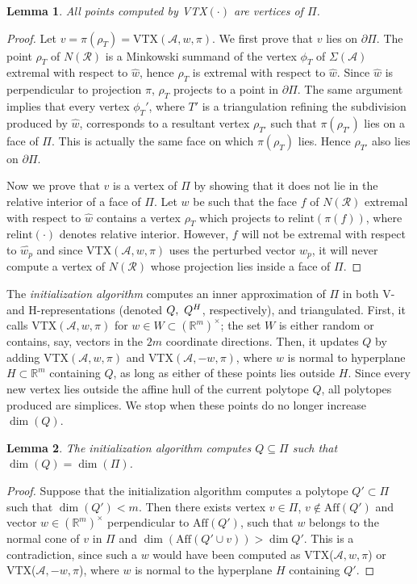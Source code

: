 \documentclass{article}
\newtheorem{lemma}{Lemma}
\def\RR{{\mathbb R}} \def\ZZ{{\mathbb Z}}
\def\A{{\mathcal A}} \def\R{{\mathcal R}}
\newcommand{\Aff}{\mbox{Aff}}
\begin{document}
\begin{lemma}\label{Lpointonboundary}
All points computed by {\em VTX}$(\cdot)$ are vertices of $\varPi$.
\end{lemma} 
\begin{proof}
Let $v=\pi(\rho_T)=\mbox{VTX}(\A,w,\pi)$.
We first prove that $v$ lies on $\partial\varPi$.
The point $\rho_T$ of $N(\R)$ is a Minkowski summand of the vertex $\phi_T$ of
$\Sigma(\A)$ extremal with respect to $\widehat{w}$, hence $\rho_T$ is extremal
with respect to $\widehat{w}$. 
Since $\widehat{w}$ is perpendicular to projection $\pi$, $\rho_T$
projects to a point in $\partial\varPi$.
The same argument implies that every vertex $\phi_T'$, where $T'$ is a
triangulation refining 
the subdivision produced by $\widehat{w}$, corresponds to a  resultant vertex
$\rho_{T'}$ such that $\pi(\rho_{T'})$ lies on a face
of $\varPi$. This is actually the same face on which $\pi(\rho_T)$ lies.
Hence $\rho_{T'}$ also lies on $\partial\varPi$.

Now we prove that $v$ is a vertex of $\varPi$ 
by showing that it does not lie in the 
relative interior of a face of $\Pi$.
Let $w$ be such that 
the face $f$ of $N(\R)$ extremal with respect to
$\widehat{w}$ contains a vertex $\rho_T$ which projects to
$\mbox{relint}(\pi(f))$, where $\mbox{relint}(\cdot)$ denotes relative interior.
However, $f$ will not be extremal with respect 
to $\widehat{w_p}$ and since VTX$(\A,w,\pi)$ uses the perturbed vector $w_p$, 
it will never compute a vertex of  $N(\R)$ whose projection lies inside a face 
of $\varPi$. 
\end{proof}

The \textit{initialization algorithm}
computes an inner approximation of $\varPi$
in both V- and H-representations (denoted $Q,\ Q^{H}$, respectively),
and triangulated.
First, it calls {VTX}$(\A,w,\pi)$ for
$w\in W\subset(\RR^m)^\times$; the set $W$ is either random or contains,
say, vectors in the $2m$ coordinate directions.
Then, it updates $Q$ by adding {VTX}$(\A,w,\pi)$ and {VTX}$(\A,-w,\pi)$,
where $w$ is normal to hyperplane $H\subset \RR^m$ containing $Q$,
as long as either of these points lies outside $H$.
Since every new vertex lies outside the affine hull of the current 
polytope $Q$, all polytopes produced are simplices.
We stop when these points do no longer increase $\dim(Q)$. 

\begin{lemma}\label{Linit}
The initialization algorithm computes $Q\subseteq \varPi$
such that $\dim(Q)=\dim(\varPi)$.
\end{lemma}
\begin{proof}
Suppose that the initialization algorithm computes a polytope $Q'\subset \varPi$ 
such that $\dim(Q')<m$. Then there exists vertex
$v \in \varPi$, $v\notin \Aff(Q')$ and vector
$w\in (\RR^m)^\times$ perpendicular to $\Aff(Q')$,
such that $w$ belongs to the normal cone of $v$
in $\varPi$ and $\dim(\Aff(Q' \cup v)) > \dim Q'$.
This is a contradiction, since such a $w$ would have been computed
as VTX($\A,w,\pi$) or VTX($\A,-w,\pi$),
where $w$ is normal to the hyperplane $H$ containing $Q'$.
\end{proof} 
\end{document}
